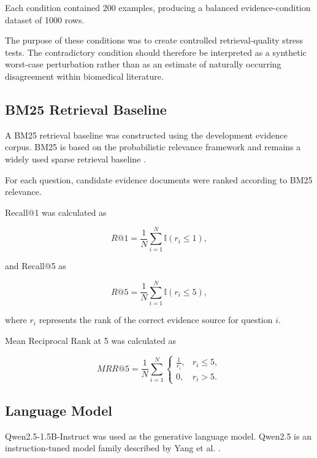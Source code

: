 \documentclass[conference]{IEEEtran}
\begin{document}
Each condition contained 200 examples, producing a balanced evidence-condition dataset of 1000 rows.

The purpose of these conditions was to create controlled retrieval-quality stress tests. The contradictory condition should therefore be interpreted as a synthetic worst-case perturbation rather than as an estimate of naturally occurring disagreement within biomedical literature.

\subsection{BM25 Retrieval Baseline}

A BM25 retrieval baseline was constructed using the development evidence corpus. BM25 is based on the probabilistic relevance framework and remains a widely used sparse retrieval baseline \cite{robertson2009bm25}.

For each question, candidate evidence documents were ranked according to BM25 relevance.

Recall@1 was calculated as

\begin{equation}
R@1 =
\frac{1}{N}
\sum_{i=1}^{N}
\mathbb{I}(r_i \leq 1),
\end{equation}

and Recall@5 as

\begin{equation}
R@5 =
\frac{1}{N}
\sum_{i=1}^{N}
\mathbb{I}(r_i \leq 5),
\end{equation}

where $r_i$ represents the rank of the correct evidence source for question $i$.

Mean Reciprocal Rank at 5 was calculated as

\begin{equation}
MRR@5 =
\frac{1}{N}
\sum_{i=1}^{N}
\begin{cases}
\frac{1}{r_i}, & r_i \leq 5, \\
0, & r_i > 5.
\end{cases}
\end{equation}

\subsection{Language Model}

Qwen2.5-1.5B-Instruct was used as the generative language model. Qwen2.5 is an instruction-tuned model family described by Yang et al. \cite{yang2024qwen25}.
\end{document}
